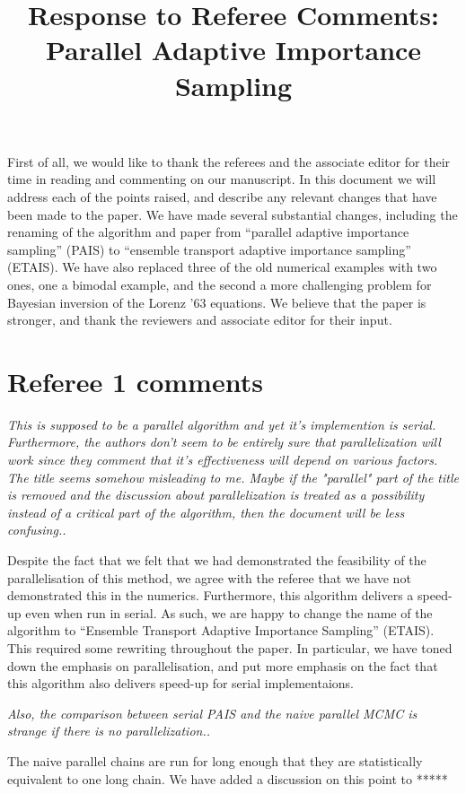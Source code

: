 \documentclass{article}
\newcommand{\comment}[2]{\vspace{0.6cm}{\bf Comment:} {\it #1.}

\vspace{0.3cm}{\bf Answer:} #2}
\begin{document}
\title{Response to Referee Comments: Parallel Adaptive Importance Sampling}
\maketitle
First of all, we would like to thank the referees and the associate editor for
their time in reading and commenting on our manuscript. In this document
we will address each of the points raised, and describe any relevant
changes that have been made to the paper. We have made several substantial changes, including the renaming of the algorithm and paper from ``parallel adaptive importance sampling'' (PAIS) to ``ensemble transport adaptive importance sampling'' (ETAIS). We have also replaced three of the old numerical examples with two ones, one a bimodal example, and the second a more challenging problem for Bayesian inversion of the Lorenz '63 equations. We believe that the paper is stronger, and thank the reviewers and associate editor for their input.

\section*{Referee 1 comments}

\comment{This is supposed to be a parallel algorithm and yet it's implemention is serial. Furthermore, the authors don't seem to be entirely sure that parallelization will work since they comment that it's effectiveness will depend on various factors. The title seems somehow misleading to me. Maybe if the "parallel" part of the title is removed and the discussion about parallelization is treated as a possibility instead of a critical part of the algorithm, then the document will be less confusing.}{Despite the fact that we felt that we had demonstrated the feasibility of the parallelisation of this method, we agree with the referee that we have not demonstrated this in the numerics. Furthermore, this algorithm delivers a speed-up even when run in serial. As such, we are happy to change the name of the algorithm to ``Ensemble Transport Adaptive Importance Sampling'' (ETAIS). This required some rewriting throughout the paper. In particular, we have toned down the emphasis on parallelisation, and put more emphasis on the fact that this algorithm also delivers speed-up for serial implementaions.}

\comment{Also, the comparison between serial PAIS and the naive parallel MCMC is strange if there is no parallelization.}{The naive parallel chains are run for long enough that they are statistically equivalent to one long chain. We have added a discussion on this point to *****}
\end{document}

